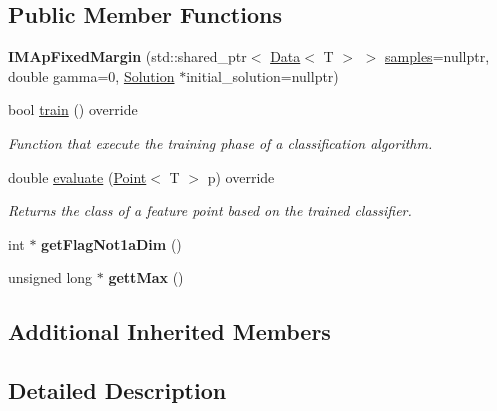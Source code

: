 \subsection*{Public Member Functions}
\begin{DoxyCompactItemize}
\item 
{\bfseries I\+M\+Ap\+Fixed\+Margin} (std\+::shared\+\_\+ptr$<$ \hyperlink{class_data}{Data}$<$ T $>$ $>$ \hyperlink{class_classifier_a0000b47a2e0784ada4c52d7046c4adb8}{samples}=nullptr, double gamma=0, \hyperlink{class_solution}{Solution} $\ast$initial\+\_\+solution=nullptr)\hypertarget{class_i_m_ap_fixed_margin_a90724da378b06629c891dea9fa49e379}{}\label{class_i_m_ap_fixed_margin_a90724da378b06629c891dea9fa49e379}

\item 
bool \hyperlink{class_i_m_ap_fixed_margin_a4d99742be5fe5a21b8ae6f99547a98c8}{train} () override
\begin{DoxyCompactList}\small\item\em Function that execute the training phase of a classification algorithm. \end{DoxyCompactList}\item 
double \hyperlink{class_i_m_ap_fixed_margin_a909eb58c78c20780494598b478f8846f}{evaluate} (\hyperlink{class_point}{Point}$<$ T $>$ p) override
\begin{DoxyCompactList}\small\item\em Returns the class of a feature point based on the trained classifier. \end{DoxyCompactList}\item 
int $\ast$ {\bfseries get\+Flag\+Not1a\+Dim} ()\hypertarget{class_i_m_ap_fixed_margin_ac928b3c55da2171adce3231223f85d42}{}\label{class_i_m_ap_fixed_margin_ac928b3c55da2171adce3231223f85d42}

\item 
unsigned long $\ast$ {\bfseries gett\+Max} ()\hypertarget{class_i_m_ap_fixed_margin_a90bd97bde25c511399400a85a5f786e2}{}\label{class_i_m_ap_fixed_margin_a90bd97bde25c511399400a85a5f786e2}

\end{DoxyCompactItemize}
\subsection*{Additional Inherited Members}


\subsection{Detailed Description}
